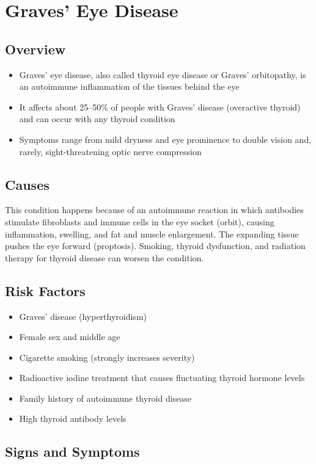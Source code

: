 \chapter{Graves' Eye Disease}
\label{sec:Graves' Eye Disease}

\section{Overview}
\begin{itemize}[noitemsep]
  \item Graves' eye disease, also called thyroid eye disease or Graves' orbitopathy, is an autoimmune inflammation of the tissues behind the eye
  \item It affects about 25--50\% of people with Graves' disease (overactive thyroid) and can occur with any thyroid condition
  \item Symptoms range from mild dryness and eye prominence to double vision and, rarely, sight-threatening optic nerve compression
\end{itemize}
\section{Causes}
This condition happens because of an autoimmune reaction in which antibodies stimulate fibroblasts and immune cells in the eye socket (orbit), causing inflammation, swelling, and fat and muscle enlargement. The expanding tissue pushes the eye forward (proptosis). Smoking, thyroid dysfunction, and radiation therapy for thyroid disease can worsen the condition.
\section{Risk Factors}
\begin{itemize}[noitemsep]
  \item Graves' disease (hyperthyroidism)
  \item Female sex and middle age
  \item Cigarette smoking (strongly increases severity)
  \item Radioactive iodine treatment that causes fluctuating thyroid hormone levels
  \item Family history of autoimmune thyroid disease
  \item High thyroid antibody levels
\end{itemize}
\section{Signs and Symptoms}

